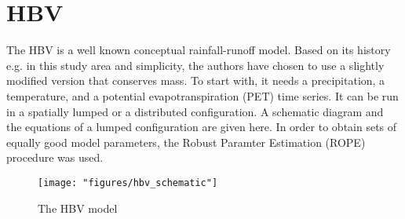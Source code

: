 \section{HBV}
\label{sec_hbv}

The HBV \citep{berg_1992} is a well known conceptual rainfall-runoff model. Based on its history e.g. \citep{das_bar_2008, got_bar_2007, hun_bar_2004} in this study area and simplicity, the authors have chosen to use a slightly modified version that conserves mass. To start with, it needs a precipitation, a temperature, and a potential evapotranspiration (PET) time series. It can be run in a spatially lumped or a distributed configuration. A schematic diagram and the equations of a lumped configuration are given here. In order to obtain sets of equally good model parameters, the Robust Paramter Estimation (ROPE) procedure \cite{Barsingh2008} was used.

\begin{figure}[h]
\centering
\texttt{[image: "figures/hbv\_schematic"]}
\caption{The HBV model}
\label{fig_hbv}
\end{figure}

